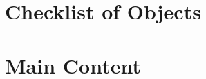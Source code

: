 \documentclass[a4paper]{book}
\begin{document}





\onecolumn

\chapter{Checklist of Objects}



\chapter{Main Content}

\setlength{\oddsidemargin}{-0.5in} 
\setlength{\marginparwidth}{0in}
\setlength{\marginparsep}{0in}
\setlength{\topmargin}{0.1in}
\setlength{\leftmargin}{-0.5in}
\setlength{\rightmargin}{-0.5in}
\addtolength{\textwidth}{0.7in}


\end{document}

